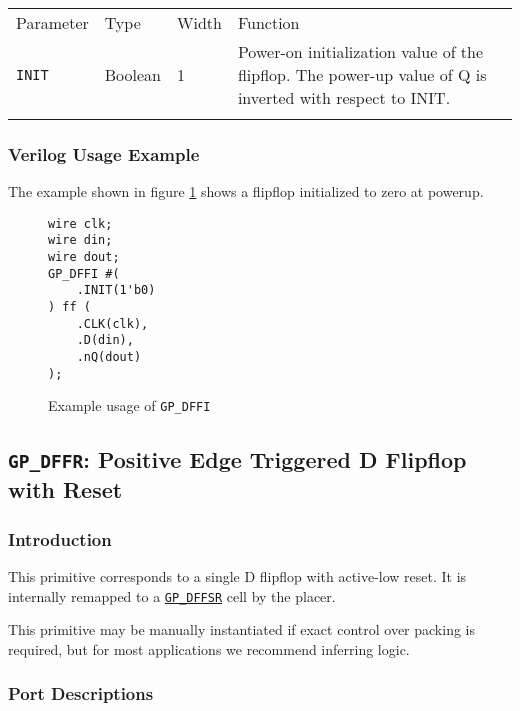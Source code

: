 \documentclass[11pt]{article}
\newcommand{\tokenstyle}[1]{\texttt{#1}}
\newcommand{\whenstyle}[1]{{\fontseries{sb}\selectfont#1}}
\newcommand{\tokenref}[2]{\hyperref[#2]{\tokenstyle{#1}}}
\newcommand{\thinhline}{\Xhline{1\arrayrulewidth}}
\newcommand{\thickhline}{\Xhline{2.5\arrayrulewidth}}
\begin{document}
\begin{tabularx}{\textwidth}{lllX}
\thinhline
\whenstyle{Parameter} & \whenstyle{Type} & \whenstyle{Width} & \whenstyle{Function} \\
\thickhline
\tokenstyle{INIT} & Boolean & 1 & Power-on initialization value of the flipflop. \newline The power-up value of Q is inverted
with respect to INIT.\\
\thinhline
\end{tabularx}

\subsubsection{Verilog Usage Example}

The example shown in figure \ref{gp-dffi-example} shows a flipflop initialized to zero at powerup.

\begin{figure}[h]
\begin{lstlisting}
wire clk;
wire din;
wire dout;
GP_DFFI #(
	.INIT(1'b0)
) ff (
	.CLK(clk),
	.D(din),
	.nQ(dout)
);
\end{lstlisting}
\caption{Example usage of \tokenstyle{GP\_DFFI}}
\label{gp-dffi-example}
\end{figure}


\pagebreak
\subsection{\tokenstyle{GP\_DFFR}: Positive Edge Triggered D Flipflop with Reset}
\label{gp-dffr}

\subsubsection{Introduction}
This primitive corresponds to a single D flipflop with active-low reset. It is internally remapped to a
\tokenref{GP\_DFFSR}{gp-dffsr} cell by the placer.

This primitive may be manually instantiated if exact control over packing is required, but for most applications we
recommend inferring logic.

\subsubsection{Port Descriptions}
\end{document}
